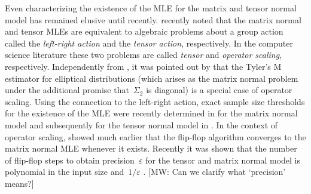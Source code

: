 \documentclass[aos]{imsart}
\theoremstyle{definition}
\numberwithin{equation}{section}
\newcommand{\eps}{\varepsilon}
\newcommand{\CF}[1]{{\color{purple}[CF: #1]}}
\newcommand{\MW}[1]{{\color{red}[MW: #1]}}
\begin{document}
Even characterizing the existence of the MLE for the matrix and tensor normal model has remained elusive until recently.
\cite{amendola2020invariant} recently noted that the matrix normal and tensor MLEs are equivalent to algebraic problems about a group action called the \emph{left-right action} and the \emph{tensor action}, respectively.
In the computer science literature these two problems are called \emph{tensor} and \emph{operator scaling}, respectively.
Independently from \cite{amendola2020invariant}, it was pointed out by \cite{FM20} that the Tyler's M estimator for elliptical distributions (which arises as the matrix normal problem under the additional promise that~$\Sigma_2$ is diagonal) is a special case of operator scaling.
Using the connection to the left-right action, exact sample size thresholds for the existence of the MLE were recently determined in \cite{derksen2020matrix} for the matrix normal model and subsequently for the tensor normal model in \cite{derksen2020tensor}.
In the context of operator scaling, \cite{gurvits2004classical} showed much earlier that the flip-flop algorithm converges to the matrix normal MLE whenever it exists.
Recently it was shown that the number of flip-flop steps to obtain precision~$\eps$ for the tensor and matrix normal model is polynomial in the input size and~$1/\eps$ \citep{GGOW19,burgisser2017alternating,burgisser2019towards}.
\MW{Can we clarify what `precision' means?}


\end{document}

